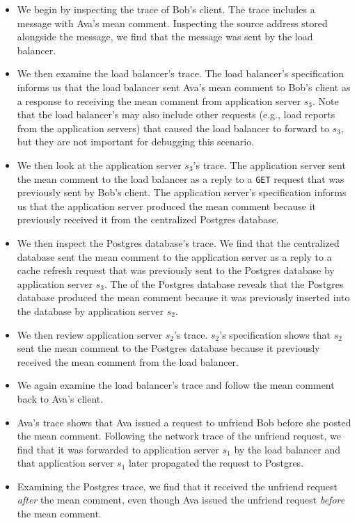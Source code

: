 \begin{itemize}
  \item
    We begin by inspecting the trace of Bob's \systemname{} client. The trace
    includes a message with Ava's mean comment. Inspecting the source address
    stored alongside the message, we find that the message was sent by the load
    balancer.
  \item
    We then examine the load balancer's trace. The load balancer's
    \watprovenance{} specification informs us that the load balancer sent Ava's
    mean comment to Bob's \systemname{} client as a response to receiving the
    mean comment from application server $s_3$. Note that the load balancer's
    \watprovenance{} may also include other requests (e.g., load reports from
    the application servers) that caused the load balancer to forward to $s_3$,
    but they are not important for debugging this scenario.
  \item
    We then look at the application server $s_3$'s trace. The application
    server sent the mean comment to the load balancer as a reply to a
    \texttt{GET} request that was previously sent by Bob's \systemname{}
    client. The application server's \watprovenance{} specification informs us
    that the application server produced the mean comment because it previously
    received it from the centralized Postgres database.
  \item
    We then inspect the Postgres database's trace. We find that the centralized
    database sent the mean comment to the application server as a reply to a
    cache refresh request that was previously sent to the Postgres database by
    application server $s_3$. The \watprovenance{} of the Postgres database
    reveals that the Postgres database produced the mean comment because it was
    previously inserted into the database by application server $s_2$.
  \item
    We then review application server $s_2$'s trace. $s_2$'s \watprovenance{}
    specification shows that $s_2$ sent the mean comment to the Postgres
    database because it previously received the mean comment from the load
    balancer.
  \item
    We again examine the load balancer's trace and follow the mean comment back
    to Ava's \systemname{} client.
  \item
    Ava's trace shows that Ava issued a request to unfriend Bob before she
    posted the mean comment. Following the network trace of the unfriend
    request, we find that it was forwarded to application server $s_1$ by the
    load balancer and that application server $s_1$ later propagated the
    request to Postgres.
  \item
    Examining the Postgres trace, we find that it received the unfriend request
    \emph{after} the mean comment, even though Ava issued the unfriend request
    \emph{before} the mean comment.
\end{itemize}

